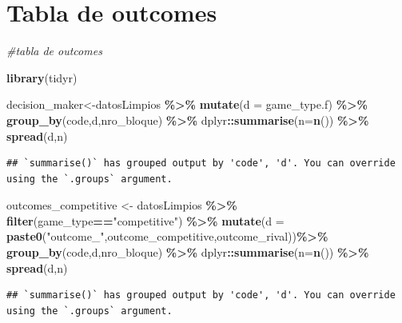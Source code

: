 \documentclass[
]{article}
\newenvironment{Shaded}{\begin{snugshade}}{\end{snugshade}}
\newcommand{\AttributeTok}[1]{\textcolor[rgb]{0.13,0.29,0.53}{#1}}
\newcommand{\CommentTok}[1]{\textcolor[rgb]{0.56,0.35,0.01}{\textit{#1}}}
\newcommand{\FunctionTok}[1]{\textcolor[rgb]{0.13,0.29,0.53}{\textbf{#1}}}
\newcommand{\NormalTok}[1]{#1}
\newcommand{\OtherTok}[1]{\textcolor[rgb]{0.56,0.35,0.01}{#1}}
\newcommand{\SpecialCharTok}[1]{\textcolor[rgb]{0.81,0.36,0.00}{\textbf{#1}}}
\newcommand{\StringTok}[1]{\textcolor[rgb]{0.31,0.60,0.02}{#1}}
\begin{document}
\hypertarget{tabla-de-outcomes}{%
\section{Tabla de outcomes}\label{tabla-de-outcomes}}

\begin{Shaded}
\begin{Highlighting}[]
\CommentTok{\#tabla de outcomes}

\FunctionTok{library}\NormalTok{(tidyr)}

\NormalTok{decision\_maker}\OtherTok{\textless{}{-}}\NormalTok{datosLimpios }\SpecialCharTok{\%\textgreater{}\%}  \FunctionTok{mutate}\NormalTok{(}\AttributeTok{d =}\NormalTok{ game\_type.f) }\SpecialCharTok{\%\textgreater{}\%}  \FunctionTok{group\_by}\NormalTok{(code,d,nro\_bloque) }\SpecialCharTok{\%\textgreater{}\%}\NormalTok{ dplyr}\SpecialCharTok{::}\FunctionTok{summarise}\NormalTok{(}\AttributeTok{n=}\FunctionTok{n}\NormalTok{()) }\SpecialCharTok{\%\textgreater{}\%} \FunctionTok{spread}\NormalTok{(d,n)}
\end{Highlighting}
\end{Shaded}

\begin{verbatim}
## `summarise()` has grouped output by 'code', 'd'. You can override using the `.groups` argument.
\end{verbatim}

\begin{Shaded}
\begin{Highlighting}[]
\NormalTok{outcomes\_competitive }\OtherTok{\textless{}{-}}\NormalTok{ datosLimpios }\SpecialCharTok{\%\textgreater{}\%} \FunctionTok{filter}\NormalTok{(game\_type}\SpecialCharTok{==}\StringTok{"competitive"}\NormalTok{) }\SpecialCharTok{\%\textgreater{}\%} \FunctionTok{mutate}\NormalTok{(}\AttributeTok{d =} \FunctionTok{paste0}\NormalTok{(}\StringTok{"outcome\_"}\NormalTok{,outcome\_competitive,outcome\_rival))}\SpecialCharTok{\%\textgreater{}\%}  \FunctionTok{group\_by}\NormalTok{(code,d,nro\_bloque) }\SpecialCharTok{\%\textgreater{}\%}\NormalTok{ dplyr}\SpecialCharTok{::}\FunctionTok{summarise}\NormalTok{(}\AttributeTok{n=}\FunctionTok{n}\NormalTok{()) }\SpecialCharTok{\%\textgreater{}\%} \FunctionTok{spread}\NormalTok{(d,n)}
\end{Highlighting}
\end{Shaded}

\begin{verbatim}
## `summarise()` has grouped output by 'code', 'd'. You can override using the `.groups` argument.
\end{verbatim}
\end{document}
